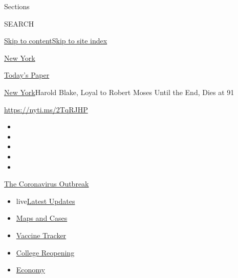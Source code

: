 Sections

SEARCH

\protect\hyperlink{site-content}{Skip to
content}\protect\hyperlink{site-index}{Skip to site index}

\href{https://www.nytimes.com/section/nyregion}{New York}

\href{https://myaccount.nytimes.com/auth/login?response_type=cookie\&client_id=vi}{}

\href{https://www.nytimes.com/section/todayspaper}{Today's Paper}

\href{/section/nyregion}{New York}\textbar{}Harold Blake, Loyal to
Robert Moses Until the End, Dies at 91

\url{https://nyti.ms/2TqRJHP}

\begin{itemize}
\item
\item
\item
\item
\item
\end{itemize}

\href{https://www.nytimes.com/news-event/coronavirus?action=click\&pgtype=Article\&state=default\&region=TOP_BANNER\&context=storylines_menu}{The
Coronavirus Outbreak}

\begin{itemize}
\tightlist
\item
  live\href{https://www.nytimes.com/2020/08/03/world/coronavirus-covid-19.html?action=click\&pgtype=Article\&state=default\&region=TOP_BANNER\&context=storylines_menu}{Latest
  Updates}
\item
  \href{https://www.nytimes.com/interactive/2020/us/coronavirus-us-cases.html?action=click\&pgtype=Article\&state=default\&region=TOP_BANNER\&context=storylines_menu}{Maps
  and Cases}
\item
  \href{https://www.nytimes.com/interactive/2020/science/coronavirus-vaccine-tracker.html?action=click\&pgtype=Article\&state=default\&region=TOP_BANNER\&context=storylines_menu}{Vaccine
  Tracker}
\item
  \href{https://www.nytimes.com/2020/08/02/us/covid-college-reopening.html?action=click\&pgtype=Article\&state=default\&region=TOP_BANNER\&context=storylines_menu}{College
  Reopening}
\item
  \href{https://www.nytimes.com/live/2020/08/03/business/stock-market-today-coronavirus?action=click\&pgtype=Article\&state=default\&region=TOP_BANNER\&context=storylines_menu}{Economy}
\end{itemize}

